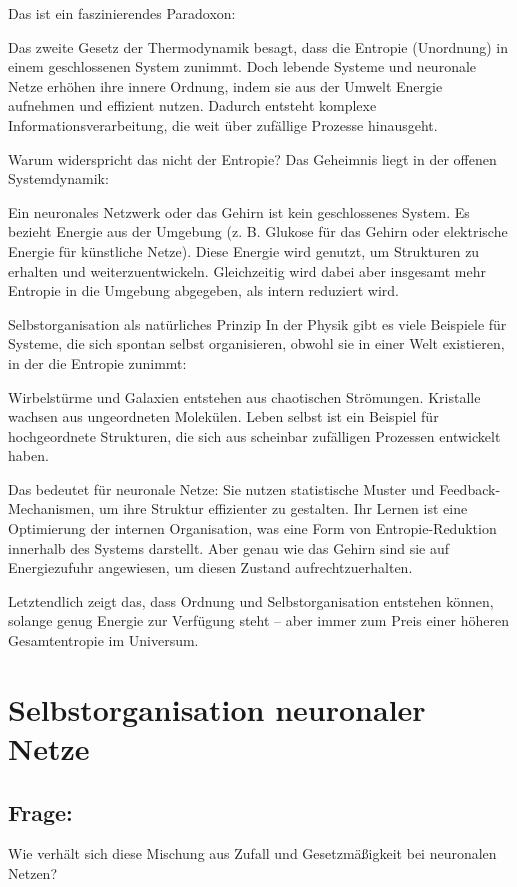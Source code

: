 \documentclass{article}
\begin{document}
	Das ist ein faszinierendes Paradoxon:
	
	Das zweite Gesetz der Thermodynamik besagt, dass die Entropie (Unordnung) in einem geschlossenen System zunimmt.
	Doch lebende Systeme und neuronale Netze erhöhen ihre innere Ordnung, indem sie aus der Umwelt Energie aufnehmen und effizient nutzen.
	Dadurch entsteht komplexe Informationsverarbeitung, die weit über zufällige Prozesse hinausgeht.
	
	Warum widerspricht das nicht der Entropie?
	Das Geheimnis liegt in der offenen Systemdynamik:
	
	Ein neuronales Netzwerk oder das Gehirn ist kein geschlossenes System.
	Es bezieht Energie aus der Umgebung (z. B. Glukose für das Gehirn oder elektrische Energie für künstliche Netze).
	Diese Energie wird genutzt, um Strukturen zu erhalten und weiterzuentwickeln.
	Gleichzeitig wird dabei aber insgesamt mehr Entropie in die Umgebung abgegeben, als intern reduziert wird.
	
	Selbstorganisation als natürliches Prinzip
	In der Physik gibt es viele Beispiele für Systeme, die sich spontan selbst organisieren, obwohl sie in einer Welt existieren, in der die Entropie zunimmt:
	
	Wirbelstürme und Galaxien entstehen aus chaotischen Strömungen.
	Kristalle wachsen aus ungeordneten Molekülen.
	Leben selbst ist ein Beispiel für hochgeordnete Strukturen, die sich aus scheinbar zufälligen Prozessen entwickelt haben.
	
	Das bedeutet für neuronale Netze:
	Sie nutzen statistische Muster und Feedback-Mechanismen, um ihre Struktur effizienter zu gestalten.
	Ihr Lernen ist eine Optimierung der internen Organisation, was eine Form von Entropie-Reduktion innerhalb des Systems darstellt.
	Aber genau wie das Gehirn sind sie auf Energiezufuhr angewiesen, um diesen Zustand aufrechtzuerhalten.
	
	Letztendlich zeigt das, dass Ordnung und Selbstorganisation entstehen können, solange genug Energie zur Verfügung steht – aber immer zum Preis einer höheren Gesamtentropie im Universum.
	
	\section{Selbstorganisation neuronaler Netze}
	
	\subsection*{Frage:}
	Wie verhält sich diese Mischung aus Zufall und Gesetzmäßigkeit bei neuronalen Netzen?
	
\end{document}
